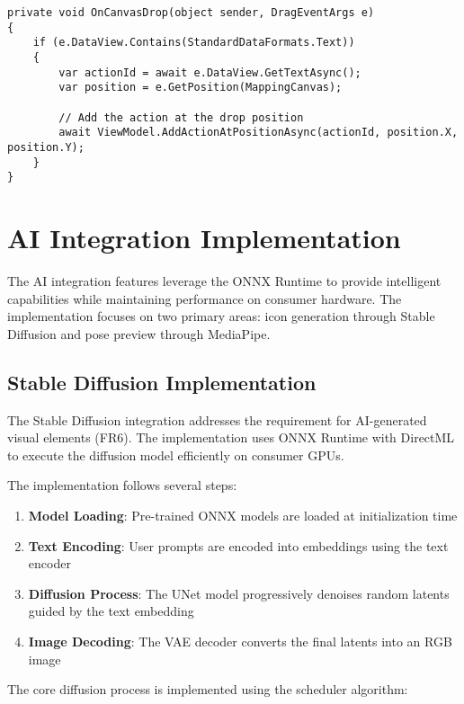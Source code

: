 \begin{verbatim}
private void OnCanvasDrop(object sender, DragEventArgs e)
{
    if (e.DataView.Contains(StandardDataFormats.Text))
    {
        var actionId = await e.DataView.GetTextAsync();
        var position = e.GetPosition(MappingCanvas);
        
        // Add the action at the drop position
        await ViewModel.AddActionAtPositionAsync(actionId, position.X, position.Y);
    }
}
\end{verbatim}

\section{AI Integration Implementation}
The AI integration features leverage the ONNX Runtime to provide intelligent capabilities while maintaining performance on consumer hardware. The implementation focuses on two primary areas: icon generation through Stable Diffusion and pose preview through MediaPipe.

\subsection{Stable Diffusion Implementation}
The Stable Diffusion integration addresses the requirement for AI-generated visual elements (FR6). The implementation uses ONNX Runtime with DirectML to execute the diffusion model efficiently on consumer GPUs.

The implementation follows several steps:

\begin{enumerate}
    \item \textbf{Model Loading}: Pre-trained ONNX models are loaded at initialization time
    \item \textbf{Text Encoding}: User prompts are encoded into embeddings using the text encoder
    \item \textbf{Diffusion Process}: The UNet model progressively denoises random latents guided by the text embedding
    \item \textbf{Image Decoding}: The VAE decoder converts the final latents into an RGB image
\end{enumerate}

The core diffusion process is implemented using the scheduler algorithm:

